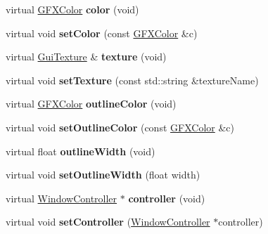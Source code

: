 \begin{DoxyCompactItemize}
\item 
virtual \hyperlink{structGFXColor}{G\+F\+X\+Color} {\bfseries color} (void)\hypertarget{classWindow_a1571bd06885c887970e3ee2fa85302f4}{}\label{classWindow_a1571bd06885c887970e3ee2fa85302f4}

\item 
virtual void {\bfseries set\+Color} (const \hyperlink{structGFXColor}{G\+F\+X\+Color} \&c)\hypertarget{classWindow_a0520e842ee3ce6a4ce229dd31174e86f}{}\label{classWindow_a0520e842ee3ce6a4ce229dd31174e86f}

\item 
virtual \hyperlink{classGuiTexture}{Gui\+Texture} \& {\bfseries texture} (void)\hypertarget{classWindow_aa9dc5ea12955fc69573c77b26ca3eba6}{}\label{classWindow_aa9dc5ea12955fc69573c77b26ca3eba6}

\item 
virtual void {\bfseries set\+Texture} (const std\+::string \&texture\+Name)\hypertarget{classWindow_ad15ee7f28a016bf7ca9308b24074d67c}{}\label{classWindow_ad15ee7f28a016bf7ca9308b24074d67c}

\item 
virtual \hyperlink{structGFXColor}{G\+F\+X\+Color} {\bfseries outline\+Color} (void)\hypertarget{classWindow_a49e41d103ef6fc4996695ef9334f4451}{}\label{classWindow_a49e41d103ef6fc4996695ef9334f4451}

\item 
virtual void {\bfseries set\+Outline\+Color} (const \hyperlink{structGFXColor}{G\+F\+X\+Color} \&c)\hypertarget{classWindow_a2aa7606ea6786729008d5f174dddca30}{}\label{classWindow_a2aa7606ea6786729008d5f174dddca30}

\item 
virtual float {\bfseries outline\+Width} (void)\hypertarget{classWindow_aa15a8506563ef4635bdb114c03d8874b}{}\label{classWindow_aa15a8506563ef4635bdb114c03d8874b}

\item 
virtual void {\bfseries set\+Outline\+Width} (float width)\hypertarget{classWindow_addd323d1f9396814300fcd1fc7f6be34}{}\label{classWindow_addd323d1f9396814300fcd1fc7f6be34}

\item 
virtual \hyperlink{classWindowController}{Window\+Controller} $\ast$ {\bfseries controller} (void)\hypertarget{classWindow_ae1a9b0151d09024d5694b2489407e5b9}{}\label{classWindow_ae1a9b0151d09024d5694b2489407e5b9}

\item 
virtual void {\bfseries set\+Controller} (\hyperlink{classWindowController}{Window\+Controller} $\ast$controller)\hypertarget{classWindow_ab8a9f51a08e55c063bbe1ba640c04188}{}\label{classWindow_ab8a9f51a08e55c063bbe1ba640c04188}


\end{DoxyCompactItemize}

